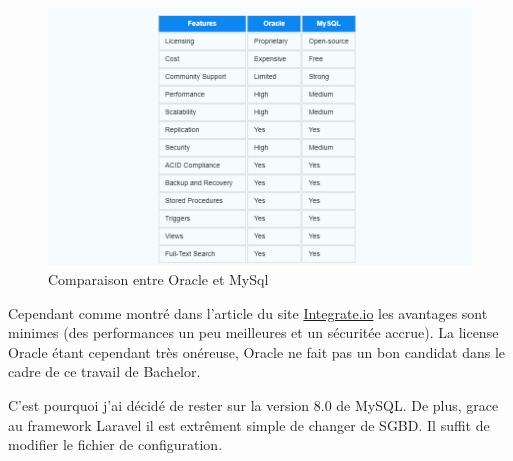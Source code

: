 \begin{center}
    \begin{figure}[H]%
        \includegraphics[width=\textwidth]{./assets/figures/OracleVsMySql.png}
        \caption{Comparaison entre Oracle et MySql \label{OracleVsMySql.png}}
    \end{figure}
\end{center}
Cependant comme montré dans l'article du site \href{https://www.integrate.io/blog/oracle-vs-mysql/#:~:text=Oracle%20supports%20distributed%20databases%20while,Oracle%20requires%20a%20licensing%20fee.}{Integrate.io} les avantages sont minimes (des performances un peu meilleures et un sécuritée accrue). La license Oracle étant cependant très onéreuse, Oracle ne fait pas un bon candidat dans le cadre de ce travail de Bachelor.

C'est pourquoi j'ai décidé de rester sur la version 8.0 de MySQL. De plus, grace au framework Laravel il est extrêment simple de changer de SGBD. Il suffit de modifier le fichier de configuration.


